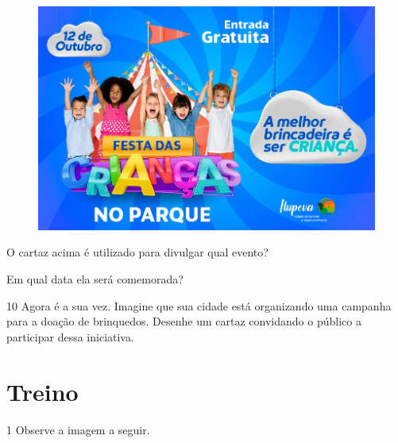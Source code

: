 \begin{figure}[H]
\centering
\includegraphics[width=.8\textwidth]{media/image135.jpeg}
\end{figure}


\begin{escolha}
\item O cartaz acima é utilizado para divulgar qual evento?\\

\item Em qual data ela será comemorada?\\
\end{escolha}

\num{10} Agora é a sua vez. Imagine que sua cidade está organizando uma campanha para a doação de brinquedos. Desenhe um cartaz convidando o público a participar dessa iniciativa.

\begin{mdframed}[linewidth=2pt,linecolor=salmao]
\vspace{4cm}
\end{mdframed}

\pagebreak
\section*{Treino}

\num{1} Observe a imagem a seguir.

